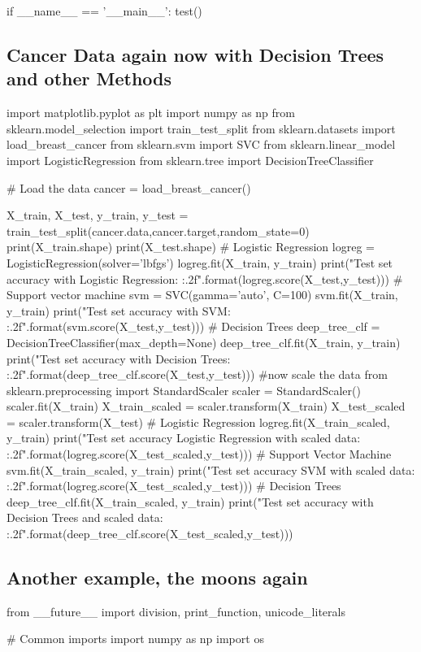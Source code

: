 \documentclass[%
oneside,                 %
final,                   %
10pt]{article}
\begin{document}
if __name__ == '__main__':
	test()
\epycod

\subsection{Cancer Data again now with Decision Trees and other Methods}
\bpycod
import matplotlib.pyplot as plt
import numpy as np
from sklearn.model_selection import  train_test_split 
from sklearn.datasets import load_breast_cancer
from sklearn.svm import SVC
from sklearn.linear_model import LogisticRegression
from sklearn.tree import DecisionTreeClassifier

# Load the data
cancer = load_breast_cancer()

X_train, X_test, y_train, y_test = train_test_split(cancer.data,cancer.target,random_state=0)
print(X_train.shape)
print(X_test.shape)
# Logistic Regression
logreg = LogisticRegression(solver='lbfgs')
logreg.fit(X_train, y_train)
print("Test set accuracy with Logistic Regression: {:.2f}".format(logreg.score(X_test,y_test)))
# Support vector machine
svm = SVC(gamma='auto', C=100)
svm.fit(X_train, y_train)
print("Test set accuracy with SVM: {:.2f}".format(svm.score(X_test,y_test)))
# Decision Trees
deep_tree_clf = DecisionTreeClassifier(max_depth=None)
deep_tree_clf.fit(X_train, y_train)
print("Test set accuracy with Decision Trees: {:.2f}".format(deep_tree_clf.score(X_test,y_test)))
#now scale the data
from sklearn.preprocessing import StandardScaler
scaler = StandardScaler()
scaler.fit(X_train)
X_train_scaled = scaler.transform(X_train)
X_test_scaled = scaler.transform(X_test)
# Logistic Regression
logreg.fit(X_train_scaled, y_train)
print("Test set accuracy Logistic Regression with scaled data: {:.2f}".format(logreg.score(X_test_scaled,y_test)))
# Support Vector Machine
svm.fit(X_train_scaled, y_train)
print("Test set accuracy SVM with scaled data: {:.2f}".format(logreg.score(X_test_scaled,y_test)))
# Decision Trees
deep_tree_clf.fit(X_train_scaled, y_train)
print("Test set accuracy with Decision Trees and scaled data: {:.2f}".format(deep_tree_clf.score(X_test_scaled,y_test)))

\epycod


\subsection{Another example, the moons again}
\bpycod
from __future__ import division, print_function, unicode_literals

# Common imports
import numpy as np
import os
\end{document}
